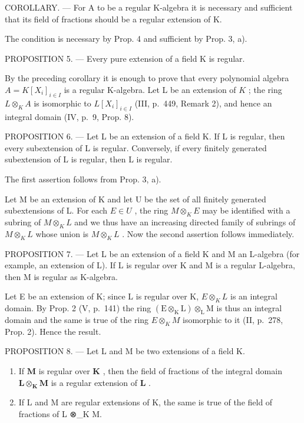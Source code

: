COROLLARY. --- For A to be a regular K-algebra it is necessary and sufficient that its field of fractions should be a regular extension of K.

The condition is necessary by Prop. 4 and sufficient by Prop. 3, a).

PROPOSITION 5. --- Every pure extension of a field K is regular.

By the preceding corollary it is enough to prove that every polynomial algebra \(A = K[X_{i}]_{i \in I}\) is a regular K-algebra. Let L be an extension of \(K\) ; the ring \(L \otimes_{K} A\) is isomorphic to \(L[X_{i}]_{i \in I}\) (III, p.~449, Remark 2), and hence an integral domain (IV, p.~9, Prop. 8).

PROPOSITION 6. --- Let L be an extension of a field K. If L is regular, then every subextension of L is regular. Conversely, if every finitely generated subextension of L is regular, then L is regular.

The first assertion follows from Prop. 3, a).

Let M be an extension of K and let U be the set of all finitely generated subextensions of L. For each \(E \in U\) , the ring \(M \otimes_{K} E\) may be identified with a subring of \(M \otimes_{K} L\) and we thus have an increasing directed family of subrings of \(M \otimes_{K} L\) whose union is \(M \otimes_{K} L\) . Now the second assertion follows immediately.

PROPOSITION 7. --- Let L be an extension of a field K and M an L-algebra (for example, an extension of L). If L is regular over K and M is a regular L-algebra, then M is regular as K-algebra.

Let E be an extension of K; since L is regular over K, \(E \otimes_{K} L\) is an integral domain. By Prop. 2 (V, p.~141) the ring \((\mathrm{E} \otimes_{\mathrm{K}} \mathrm{L}) \otimes_{\mathrm{L}} \mathrm{M}\) is thus an integral domain and the same is true of the ring \(E \otimes_{K} M\) isomorphic to it (II, p.~278, Prop. 2). Hence the result.

PROPOSITION 8. --- Let L and M be two extensions of a field K.

\begin{enumerate}
\def\labelenumi{\alph{enumi})}
\item
  If \(\mathbf{M}\) is regular over \(\mathbf{K}\) , then the field of fractions of the integral domain \(\mathbf{L} \otimes_{\mathbf{K}} \mathbf{M}\) is a regular extension of \(\mathbf{L}\) .
\item
  If L and M are regular extensions of K, the same is true of the field of fractions of L ⊗\_K M.
\end{enumerate}

